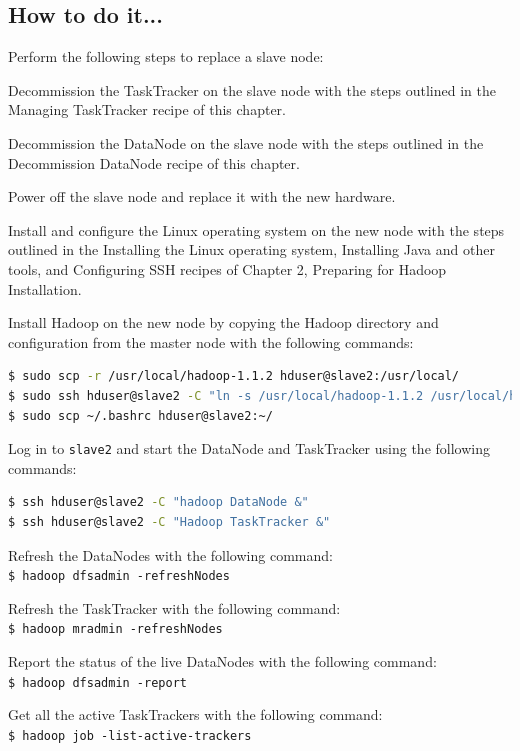 \subsection*{How to do it...}
Perform the following steps to replace a slave node:

Decommission the TaskTracker on the slave node with the steps outlined in the Managing TaskTracker recipe of this chapter. 

Decommission the DataNode on the slave node with the steps outlined in the Decommission DataNode recipe of this chapter. 

Power off the slave node and replace it with the new hardware.

Install and configure the Linux operating system on the new node with the steps outlined in the Installing the Linux operating system, Installing Java and other tools, and Configuring SSH recipes of Chapter 2, Preparing for Hadoop Installation.

Install Hadoop on the new node by copying the Hadoop directory and configuration from the master node with the following commands:
\lstset{style=bashstyle}
\begin{lstlisting}[language=bash]
$ sudo scp -r /usr/local/hadoop-1.1.2 hduser@slave2:/usr/local/
$ sudo ssh hduser@slave2 -C "ln -s /usr/local/hadoop-1.1.2 /usr/local/hadoop"
$ sudo scp ~/.bashrc hduser@slave2:~/
\end{lstlisting}

Log in to \verb|slave2| and start the DataNode and TaskTracker using the following commands: 
\lstset{style=bashstyle}
\begin{lstlisting}[language=bash]
$ ssh hduser@slave2 -C "hadoop DataNode &"
$ ssh hduser@slave2 -C "Hadoop TaskTracker &" 
\end{lstlisting}

Refresh the DataNodes with the following command: \\
\verb|$ hadoop dfsadmin -refreshNodes|

Refresh the TaskTracker with the following command: \\
\verb|$ hadoop mradmin -refreshNodes|

Report the status of the live DataNodes with the following command: \\
\verb|$ hadoop dfsadmin -report|

Get all the active TaskTrackers with the following command: \\
\verb|$ hadoop job -list-active-trackers|
